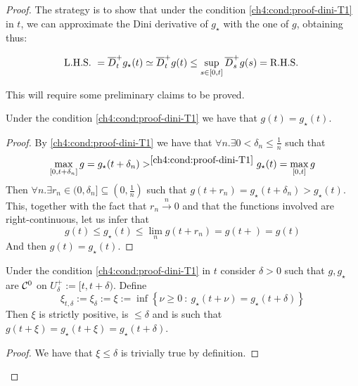 \begin{proof}
The strategy is to show that under the condition \ref{ch4:cond:proof-dini-T1} in $t$, we can approximate the Dini derivative of $g_\star$ with the one of $g$, obtaining thus:

\begin{equation*}
\mbox{L.H.S.\ } = \overline{D}_t^+g_\star(t)
\simeq \overline{D}_t^+g(t)
\leq \sup_{s\in [0,t]} \overline{D}_s^+g(s)
= \mbox{R.H.S.\ }
\end{equation*}

This will require some preliminary claims to be proved.

\begin{claim}\label{ch4:claim:g=gstar}
	Under the condition \ref{ch4:cond:proof-dini-T1} we have that $g(t) = g_\star(t)$.
\end{claim}
\begin{proof}
	By \ref{ch4:cond:proof-dini-T1} we have that $\forall n. \exists 0 < \delta_n \leq \frac{1}{n}$ such that
	\begin{equation}
		\max_{[0, t + \delta_n]} g = g_\star (t + \delta_n) 
		>^{\ref{ch4:cond:proof-dini-T1}}
		g_\star (t) = \max_{[0, t]} g
	\end{equation}
	Then $\forall n . \exists r_n \in (0, \delta_n] \subseteq (0, \frac{1}{n})$ such that $g(t + r_n ) = g_\star (t + \delta_n) > g_\star (t)$.
	This, together with the fact that $r_n \xrightarrow{n} 0$ and that the functions involved are right-continuous, let us infer that
	\begin{equation}
		g(t) \leq g_\star (t) \leq \lim_n g(t + r_n) = g(t+) = g(t)
	\end{equation}
	And then $g(t) = g_\star (t)$.
\end{proof}

\begin{claim}\label{ch4:claim:exploit-xi-of-delta}
	Under the condition \ref{ch4:cond:proof-dini-T1} in $t$ consider $\delta >0$ such that $g,g_\star$ are $\mathcal{C}^0$ on $U_\delta^+:= [t,t+\delta)$.
	Define
	\begin{equation}
		\xi_{t,\delta} := \xi_\delta := \xi := \inf \left\{ \nu \geq 0 \ : \  g_\star(t + \nu) = g_\star (t + \delta) \right\}
	\end{equation}
	Then $\xi$ is strictly positive, is $\leq \delta$ and is such that $g(t+\xi) = g_\star (t+ \xi) = g_\star(t + \delta)$.
\end{claim}

\begin{proof} We have that $\xi \leq \delta$ is trivially true by definition.
	

\end{proof}
\end{proof}
